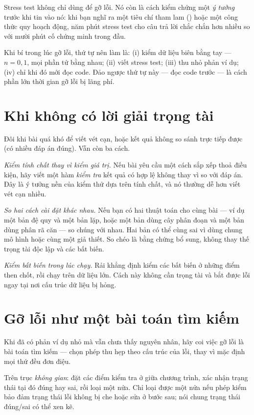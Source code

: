 \documentclass[../../algorithm.tex]{subfiles}
\begin{document}
Stress test không chỉ dùng để gỡ lỗi. Nó còn là cách kiểm chứng một \emph{ý tưởng} trước khi tin vào nó: khi bạn nghĩ ra một tiêu chí tham lam () hoặc một công thức quy hoạch động, năm phút stress test cho câu trả lời chắc chắn hơn nhiều so với mười phút cố chứng minh trong đầu.

\begin{cannho}
Khi bí trong lúc gỡ lỗi, thứ tự nên làm là: (i) kiểm dữ liệu biên bằng tay --- \(n=0,1\), mọi phần tử bằng nhau; (ii) viết stress test; (iii) thu nhỏ phản ví dụ; (iv) chỉ khi đó mới đọc code. Đảo ngược thứ tự này --- đọc code trước --- là cách phần lớn thời gian gỡ lỗi bị lãng phí.
\end{cannho}

\section{Khi không có lời giải trọng tài}

Đôi khi bài quá khó để viết vét cạn, hoặc kết quả không so sánh trực tiếp được (có nhiều đáp án đúng). Vẫn còn ba cách.

\emph{Kiểm tính chất thay vì kiểm giá trị.} Nếu bài yêu cầu một cách sắp xếp thoả điều kiện, hãy viết một hàm \emph{kiểm tra} kết quả có hợp lệ không thay vì so với đáp án. Đây là ý tưởng nền của kiểm thử dựa trên tính chất, và nó thường dễ hơn viết vét cạn nhiều.

\emph{So hai cách cài đặt khác nhau.} Nếu bạn có hai thuật toán cho cùng bài --- ví dụ một bản đệ quy và một bản lặp, hoặc một bản dùng cây phân đoạn và một bản dùng phân rã căn --- so chúng với nhau. Hai bản có thể cùng sai vì dùng chung mô hình hoặc cùng một giả thiết. So chéo là bằng chứng bổ sung, không thay thế trọng tài độc lập và các bất biến.

\emph{Kiểm bất biến trong lúc chạy.} Rải khẳng định kiểm các bất biến ở những điểm then chốt, rồi chạy trên dữ liệu lớn. Cách này không cần trọng tài và bắt được lỗi ngay tại nơi cấu trúc dữ liệu bị hỏng.

\section{Gỡ lỗi như một bài toán tìm kiếm}

Khi đã có phản ví dụ nhỏ mà vẫn chưa thấy nguyên nhân, hãy coi việc gỡ lỗi là bài toán tìm kiếm --- chọn phép thu hẹp theo cấu trúc của lỗi, thay vì mặc định mọi thứ đều đơn điệu.

Trên trục \emph{không gian}: đặt các điểm kiểm tra ở giữa chương trình, xác nhận trạng thái tại đó đúng hay sai, rồi loại một nửa. Chỉ loại được một nửa nếu phép kiểm bảo đảm trạng thái lỗi không bị che hoặc sửa ở bước sau; nói chung trạng thái đúng/sai có thể xen kẽ.
\end{document}
